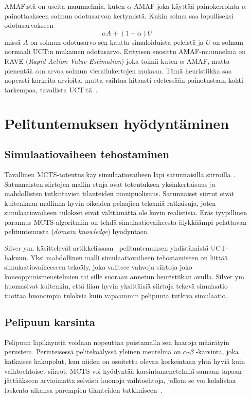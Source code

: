 \documentclass[12pt,finnish]{tktltiki2}
\theoremstyle{definition}
\theoremstyle{remark}
\begin{document}
AMAF:stä on useita muunnelmia, kuten $\alpha$-AMAF joka käyttää painokerrointa $\alpha$ painottaakseen solmun odotusarvon kertymistä. Kukin solmu saa lopulliseksi odotusarvokseen
\begin{equation}
\alpha A + (1 - \alpha)U
\end{equation}
missä $A$ on solmun odotusarvo sen kautta simuloiduista peleistä ja $U$ on solmun normaali UCT:n mukainen odotusarvo. Erityisen suosittu AMAF-muunnelma on RAVE (\textit{Rapid Action Value Estimation}) joka toimii kuten $\alpha$-AMAF, mutta pienentää $\alpha$:n arvoa solmun vierailukertojen mukaan. Tämä heuristiikka saa nopeasti karkeita arvioita, mutta vaihtaa hitaasti edetessään painotustaan kohti tarkempaa, tavallista UCT:tä~\cite{browne}.

\section{Pelituntemuksen hyödyntäminen}

\subsection{Simulaatiovaiheen tehostaminen}

Tavallinen MCTS-toteutus käy simulaatiovaiheen läpi satunnaisilla siirroilla~\cite{browne}. Satunnaisten siirtojen mallin etuja ovat toteutuksen yksinkertaisuus ja mahdollisten tutkittavien tilanteiden monipuolisuus. Satunnaiset siirrot eivät kuitenkaan mallinna hyvin oikeiden pelaajien tekemiä ratkaisuja, joten simulaatiovaiheen tulokset eivät välttämättä ole kovin realistisia. Eräs tyypillinen parannus MCTS-algoritmiin on tehdä simulaatiovaiheesta älykkäämpi pelattavan pelituntemusta (\textit{domain knowledge}) hyödyntäen.

Silver ym. käsittelevät artikkelissaan~\cite{silver} pelituntemuksen yhdistämistä UCT-hakuun. Yksi mahdollinen malli simulaatiovaiheen tehostamiseen on liittää simulaatiovaiheeseen tekoäly, joka valitsee vahvoja siirtoja joko koneoppimismenetelmien tai sille suoraan annetun heuristiikan avulla. Silver ym. huomasivat kuitenkin, että liian hyvin yksittäisiä siirtoja tekevä simulaatio tuottaa huonompia tuloksia kuin vapaammin pelipuuta tutkiva simulaatio.

\subsection{Pelipuun karsinta}

Pelipuun läpikäyntiä voidaan nopeuttaa poistamalla sen haaroja määrätyin perustein. Perinteisessä pelitekoälyssä yleinen mentelmä on $\alpha$-$\beta$ -karsinta, joka katkaisee hakupolut, kun niiden on osoitettu olevan korkeintaan yhtä hyviä kuin vaihtoehtoiset siirrot. MCTS voi hyödyntää karsintamenetelmiä samaan tapaan jättääkseen arvioimatta selvästi huonoja vaihtoehtoja, jolloin se voi kohdistaa laskenta-aikansa parempien tilanteiden tutkimiseen~\cite{browne}.
\end{document}
